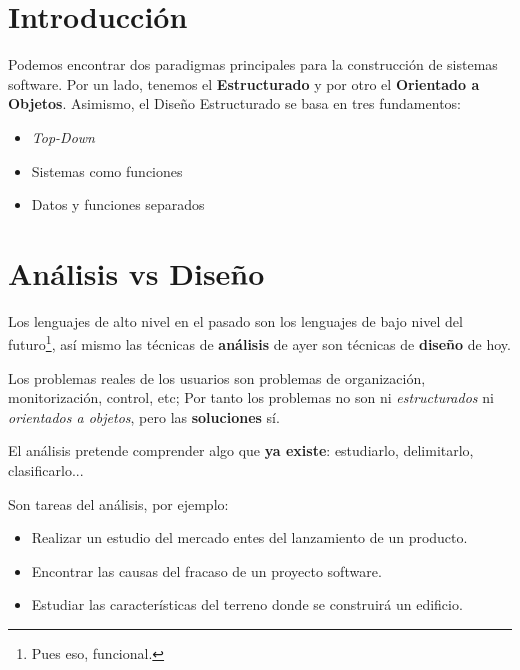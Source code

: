 

\section{Introducción}

Podemos encontrar dos paradigmas principales para la construcción de sistemas
software. Por un lado, tenemos el \textbf{Estructurado} y por otro el
\textbf{Orientado a Objetos}. Asimismo, el Diseño Estructurado se basa en tres
fundamentos:

\begin{itemize}[noitemsep]
\item \emph{Top-Down}
\item Sistemas como funciones
\item Datos y funciones separados
\end{itemize}


\section{Análisis vs Diseño}

Los lenguajes de alto nivel en el pasado son los lenguajes de bajo nivel del futuro\footnote{Pues eso, funcional.}, así mismo las técnicas de \textbf{análisis} de ayer son técnicas de \textbf{diseño} de hoy.

Los problemas reales de los usuarios son problemas de organización, monitorización, control, etc; Por tanto los problemas no son ni \textit{estructurados} ni \textit{orientados a objetos}, pero las \textbf{soluciones} sí.

El análisis pretende comprender algo que \textbf{ya existe}: estudiarlo, delimitarlo, clasificarlo...

Son tareas del análisis, por ejemplo:

\begin{itemize}[noitemsep]
\item Realizar un estudio del mercado entes del lanzamiento de un producto.
\item Encontrar las causas del fracaso de un proyecto software.
\item Estudiar las características del terreno donde se construirá un edificio.
\end{itemize}

